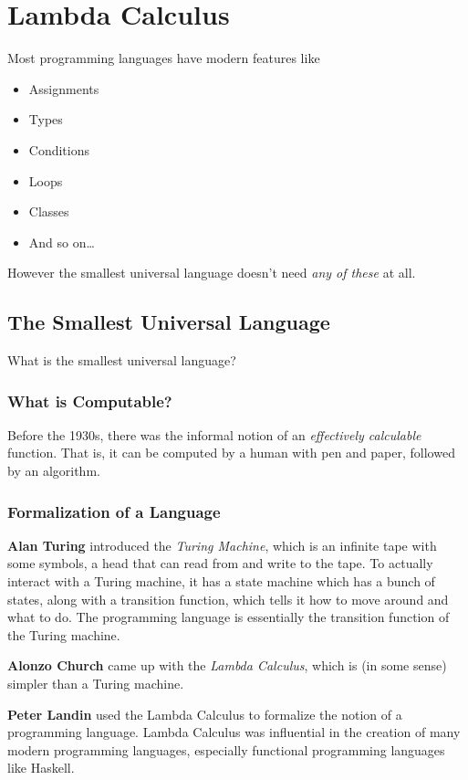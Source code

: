 \documentclass[letterpaper]{article}
\begin{document}
\section{Lambda Calculus}
Most programming languages have modern features like 
\begin{itemize}
    \item Assignments
    \item Types
    \item Conditions
    \item Loops
    \item Classes
    \item And so on\dots
\end{itemize}

However the smallest universal language doesn't need \emph{any of these} at all.

\subsection{The Smallest Universal Language}
What is the smallest universal language?

\subsubsection{What is Computable?}
Before the 1930s, there was the informal notion of an \emph{effectively calculable} function. That is, it can be computed by a human with pen and paper, followed by an algorithm. 

\bigskip 

\subsubsection{Formalization of a Language}
\textbf{Alan Turing} introduced the \emph{Turing Machine}, which is an infinite tape with some symbols, a head that can read from and write to the tape. To actually interact with a Turing machine, it has a state machine which has a bunch of states, along with a transition function, which tells it how to move around and what to do. The programming language is essentially the transition function of the Turing machine. 

\bigskip 

\textbf{Alonzo Church} came up with the \emph{Lambda Calculus}, which is (in some sense) simpler than a Turing machine. 

\bigskip 

\textbf{Peter Landin} used the Lambda Calculus to formalize the notion of a programming language. Lambda Calculus was influential in the creation of many modern programming languages, especially functional programming languages like Haskell. 
\end{document}
